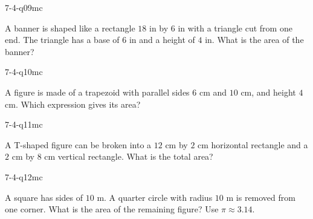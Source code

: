 \begin{practiceQuestion}{7-4-q09}{mc}
\begin{questionText}
A banner is shaped like a rectangle $18$ in by $6$ in with a triangle cut from one end. The triangle has a base of $6$ in and a height of $4$ in. What is the area of the banner?
\end{questionText}
\end{practiceQuestion}

\begin{practiceQuestion}{7-4-q10}{mc}
\begin{questionText}
A figure is made of a trapezoid with parallel sides $6$ cm and $10$ cm, and height $4$ cm. Which expression gives its area?
\end{questionText}
\end{practiceQuestion}

\begin{practiceQuestion}{7-4-q11}{mc}
\begin{questionText}
A T-shaped figure can be broken into a $12$ cm by $2$ cm horizontal rectangle and a $2$ cm by $8$ cm vertical rectangle. What is the total area?
\end{questionText}
\end{practiceQuestion}

\begin{practiceQuestion}{7-4-q12}{mc}
\begin{questionText}
A square has sides of $10$ m. A quarter circle with radius $10$ m is removed from one corner. What is the area of the remaining figure? Use $\pi \approx 3.14$.
\end{questionText}
\end{practiceQuestion}

